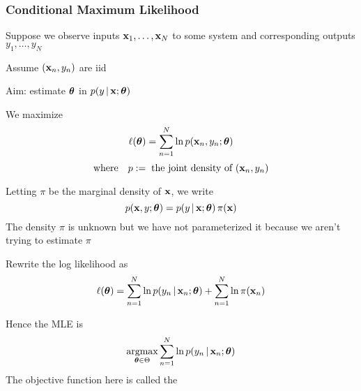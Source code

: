 \begin{frame}\frametitle{Conditional Maximum Likelihood}

    \vspace{2em}
    Suppose we observe inputs ${\mathbf x}_1, \ldots,
    {\mathbf x}_N$ to some system and corresponding outputs $y_1, \ldots, y_N$
    
    \vspace{.7em}
    Assume $({\mathbf x}_n, y_n)$ are {\sc iid}
    
    \vspace{.7em}
    Aim: estimate
    ${\boldsymbol \theta}$ in $p(y \, | \, {\mathbf x} ; {\boldsymbol \theta})$
    
    
\end{frame}

\begin{frame}

    \vspace{2em}
    We maximize 
    \begin{equation*}
        \ell({\boldsymbol \theta}) = \sum_{n=1}^N \ln p({\mathbf x}_n, y_n; {\boldsymbol \theta})
    \end{equation*}
    $$\text{where} \quad
        p := \; \text{the joint density of } ({\mathbf x}_n, y_n)$$
    
    \vspace{.7em}
    Letting $\pi$ be the marginal density of ${\mathbf x}$, we write 
    \begin{equation*}
        p({\mathbf x}, y; {\boldsymbol \theta})
        = p( y \, | \, {\mathbf x}; {\boldsymbol \theta}) \, \pi({\mathbf x})
    \end{equation*}
    The density $\pi$ is unknown but we have not parameterized it because we
    aren't trying to estimate $\pi$
    
\end{frame}

\begin{frame}
    
    \vspace{2em}
    Rewrite the log likelihood as
    \begin{equation*}
        \ell({\boldsymbol \theta}) 
        = \sum_{n=1}^N \ln p(y_n \, | \, {\mathbf x}_n; {\boldsymbol \theta}) 
        + \sum_{n=1}^N \ln \pi({\mathbf x}_n) 
    \end{equation*}
    
    \vspace{.7em}
    Hence the MLE is
    \begin{equation*}
         \argmax_{\boldtheta \in \Theta} \sum_{n=1}^N \ln p(y_n \given \boldx_n; \boldtheta)
    \end{equation*}
    The objective function here is called
    the 
    
\end{frame}

